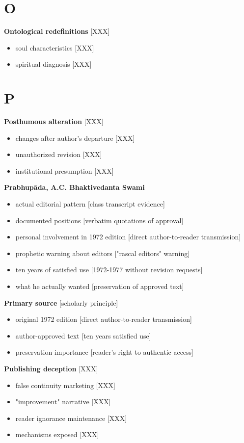 \documentclass[11pt,twoside]{book}
\begin{document}
\section*{O}
\label{sec:org4befce3}

\textbf{\textbf{Ontological redefinitions}} {[}XXX]
\begin{itemize}
\item soul characteristics [XXX]
\item spiritual diagnosis [XXX]
\end{itemize}
\section*{P}
\label{sec:org40eafce}

\textbf{\textbf{Posthumous alteration}} {[}XXX]
\begin{itemize}
\item changes after author's departure [XXX]
\item unauthorized revision [XXX]
\item institutional presumption [XXX]
\end{itemize}

\textbf{\textbf{Prabhupāda, A.C. Bhaktivedanta Swami}}
\begin{itemize}
\item actual editorial pattern [class transcript evidence]
\item documented positions [verbatim quotations of approval]
\item personal involvement in 1972 edition [direct author-to-reader transmission]
\item prophetic warning about editors ["rascal editors" warning]
\item ten years of satisfied use [1972-1977 without revision requests]
\item what he actually wanted [preservation of approved text]
\end{itemize}

\textbf{\textbf{Primary source}} {[}scholarly principle]
\begin{itemize}
\item original 1972 edition [direct author-to-reader transmission]
\item author-approved text [ten years satisfied use]
\item preservation importance [reader's right to authentic access]
\end{itemize}

\textbf{\textbf{Publishing deception}} {[}XXX]
\begin{itemize}
\item false continuity marketing [XXX]
\item "improvement" narrative [XXX]
\item reader ignorance maintenance [XXX]
\item mechanisms exposed [XXX]
\end{itemize}
\end{document}
